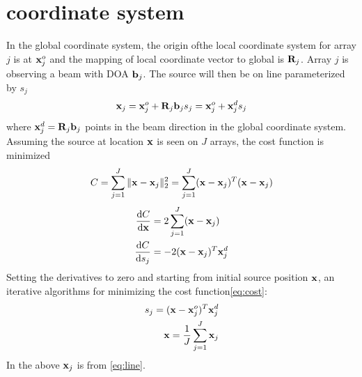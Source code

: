 \documentclass[journal]{IEEEtran}
\begin{document}
\section{coordinate system}
In the global coordinate system, the origin ofthe local coordinate system for  array $j$ is at ${\bf x}_j^o$ and the mapping of local coordinate vector to global is ${\bf R}_j$. Array $j$ is observing a beam with DOA ${\bf b}_j$. The source will then be on line parameterized by $s_j$
\begin{equation}
    {\bf x}_j={\bf x}_j^o+ {\bf R}_j {\bf b}_j s_j={\bf x}_j^o+  {\bf x}_j^d s_j\label{eq:line}
\end{equation}
where $ {\bf x}_j^d={\bf R}_j {\bf b}_j$ points in the beam direction in the global coordinate system. Assuming the source at location ${\bf x}$ is seen on $J $ arrays, the cost function is minimized
\begin{equation}
C= \sum_{j=1}^J \|{\bf x}-{\bf x}_j\|^2_2=\sum_{j=1}^J ({\bf x}-{\bf x}_j)^T({\bf x}-{\bf x}_j) \label{eq:cost}
\end{equation}
\begin{eqnarray}
\frac{{\rm d}  C}{{\rm d}{\bf x}}&=2\sum_{j=1}^J({\bf x}-{\bf x}_j)\\
\frac{{\rm d}  C}{{\rm d}{s_j}}   & =-2({\bf x}-{\bf x}_j)^T{\bf x}_j^d
\end{eqnarray}
Setting  the derivatives to zero and starting from initial source position $\bf x$, an iterative algorithms for minimizing the cost function\eqref{eq:cost}:
\begin{eqnarray}
s_j= ({\bf x}-{\bf x}_j^o)^T{\bf x}_j^d\\
{\bf x}=\frac{1}{J} \sum_{j=1}^J {\bf x}_j
\end{eqnarray}
In the above ${\bf x}_j$ is from \eqref{eq:line}. 
\end{document}
